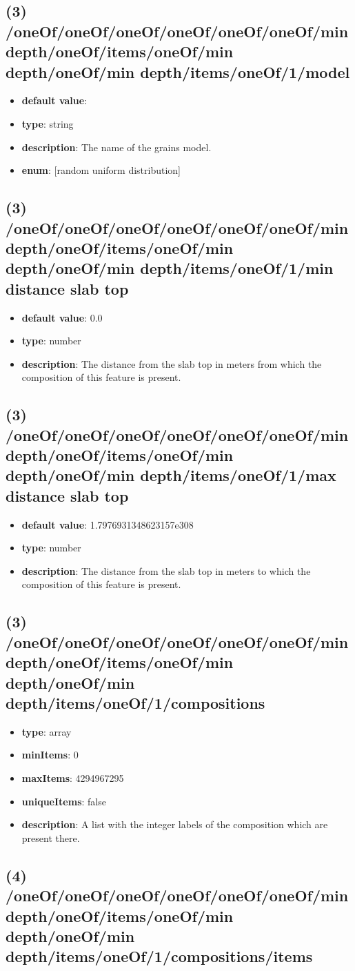 \subsection{(3) /oneOf/oneOf/oneOf/oneOf/oneOf/oneOf/min depth/oneOf/items/oneOf/min depth/oneOf/min depth/items/oneOf/1/model}
\begin{itemize}[leftmargin=3em]\item {\bf default value}: 
\item {\bf type}: string
\item {\bf description}: The name of the grains model.
\item {\bf enum}: [random uniform distribution]\end{itemize}\subsection{(3) /oneOf/oneOf/oneOf/oneOf/oneOf/oneOf/min depth/oneOf/items/oneOf/min depth/oneOf/min depth/items/oneOf/1/min distance slab top}
\begin{itemize}[leftmargin=3em]\item {\bf default value}: 0.0
\item {\bf type}: number
\item {\bf description}: The distance from the slab top in meters from which the composition of this feature is present.
\end{itemize}\subsection{(3) /oneOf/oneOf/oneOf/oneOf/oneOf/oneOf/min depth/oneOf/items/oneOf/min depth/oneOf/min depth/items/oneOf/1/max distance slab top}
\begin{itemize}[leftmargin=3em]\item {\bf default value}: 1.7976931348623157e308
\item {\bf type}: number
\item {\bf description}: The distance from the slab top in meters to which the composition of this feature is present.
\end{itemize}\subsection{(3) /oneOf/oneOf/oneOf/oneOf/oneOf/oneOf/min depth/oneOf/items/oneOf/min depth/oneOf/min depth/items/oneOf/1/compositions}
\begin{itemize}[leftmargin=3em]\item {\bf type}: array
\item {\bf minItems}: 0
\item {\bf maxItems}: 4294967295
\item {\bf uniqueItems}: false
\item {\bf description}: A list with the integer labels of the composition which are present there.
\end{itemize}\subsection{(4) /oneOf/oneOf/oneOf/oneOf/oneOf/oneOf/min depth/oneOf/items/oneOf/min depth/oneOf/min depth/items/oneOf/1/compositions/items}
